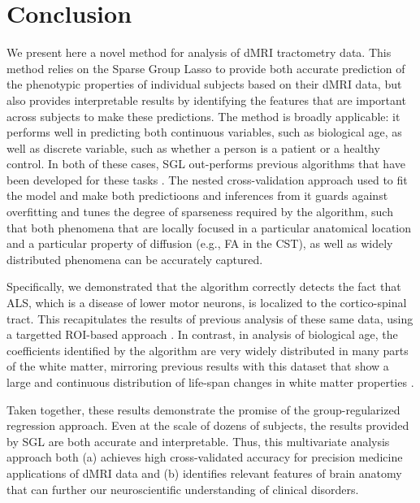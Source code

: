 \section*{Conclusion}

We present here a novel method for analysis of dMRI tractometry data. This
method relies on the Sparse Group Lasso \cite{simon2013sparse} to provide both
accurate prediction of the phenotypic properties of individual subjects based on
their dMRI data, but also provides interpretable results by identifying the
features that are important across subjects to make these predictions. The
method is broadly applicable: it performs well in predicting both continuous
variables, such as biological age, as well as discrete variable, such as whether
a person is a patient or a healthy control. In both of these cases, SGL
out-performs previous algorithms that have been developed for these tasks
\cite{sarica2017corticospinal, Richard2018-ux}. The nested cross-validation
approach used to fit the model and make both predictioons and inferences from it
guards against overfitting and tunes the degree of sparseness required by the
algorithm, such that both phenomena that are locally focused in a particular
anatomical location and a particular property of diffusion (e.g., FA in the
CST), as well as widely distributed phenomena can be accurately captured.

Specifically, we demonstrated that the algorithm correctly detects the fact that
ALS, which is a disease of lower motor neurons, is localized to the
cortico-spinal tract. This recapitulates the results of previous analysis of
these same data, using a targetted ROI-based approach
\cite{sarica2017corticospinal}. In contrast, in analysis of biological age, the
coefficients identified by the algorithm are very widely distributed in many
parts of the white matter, mirroring previous results with this dataset that
show a large and continuous distribution of life-span changes in white matter
properties \cite{yeatman2014lifespan}.

Taken together, these results demonstrate the promise of the group-regularized
regression approach. Even at the scale of dozens of subjects, the results
provided by SGL are both accurate and interpretable. Thus, this multivariate
analysis approach both (a) achieves high cross-validated accuracy for precision
medicine applications of dMRI data and (b) identifies relevant features of brain
anatomy that can further our neuroscientific understanding of clinical
disorders.

